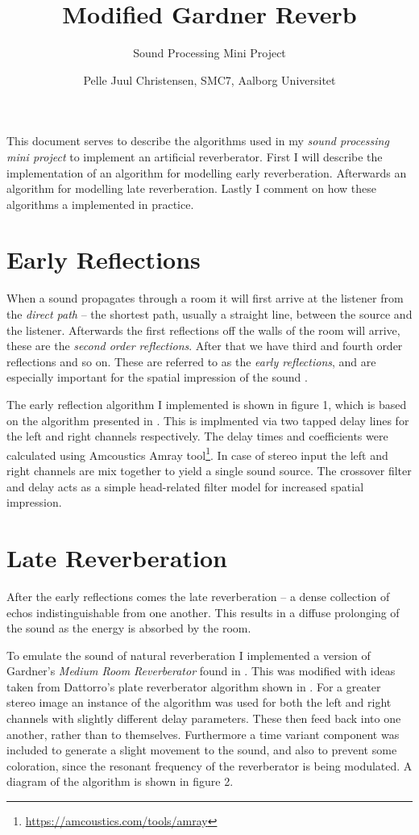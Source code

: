 \documentclass{scrartcl}
\title{Modified Gardner Reverb}
\subtitle{Sound Processing Mini Project}
\author{Pelle Juul Christensen, SMC7, Aalborg Universitet}
\begin{document}
\maketitle

This document serves to describe the algorithms used in my \textit{sound processing mini project} to implement an artificial reverberator. First I will describe the implementation of an algorithm for modelling early reverberation. Afterwards an algorithm for modelling late reverberation. Lastly I comment on how these algorithms a implemented in practice.

\section{Early Reflections}
When a sound propagates through a room it will first arrive at the listener from the \textit{direct path} -- the shortest path, usually a straight line, between the source and the listener. Afterwards the first reflections off the walls of the room will arrive, these are the \textit{second order reflections}. After that we have third and fourth order reflections and so on. These are referred to as the \textit{early reflections}, and are especially important for the spatial impression of the sound \cite[p. 100]{gardner2002}.

The early reflection algorithm I implemented is shown in figure 1, which is based on the algorithm presented in \cite[p. 104]{gardner2002}. This is implmented via two tapped delay lines for the left and right channels respectively. The delay times and coefficients were calculated using Amcoustics Amray tool\footnote{\url{https://amcoustics.com/tools/amray}}. In case of stereo input the left and right channels are mix together to yield a single sound source. The crossover filter and delay acts as a simple head-related filter model for increased spatial impression.

\section{Late Reverberation}
After the early reflections comes the late reverberation -- a dense collection of echos indistinguishable from one another. This results in a diffuse prolonging of the sound as the energy is absorbed by the room.

To emulate the sound of natural reverberation I implemented a version of Gardner's \textit{Medium Room Reverberator} found in \cite[p. 56]{gardner1982}. This was modified with ideas taken from Dattorro's plate reverberator algorithm shown in \cite[p. 117]{gardner2002}. For a greater stereo image an instance of the algorithm was used for both the left and right channels with slightly different delay parameters. These then feed back into one another, rather than to themselves. Furthermore a time variant component was included to generate a slight movement to the sound, and also to prevent some coloration, since the resonant frequency of the reverberator is being modulated. A diagram of the algorithm is shown in figure 2.
\end{document}
